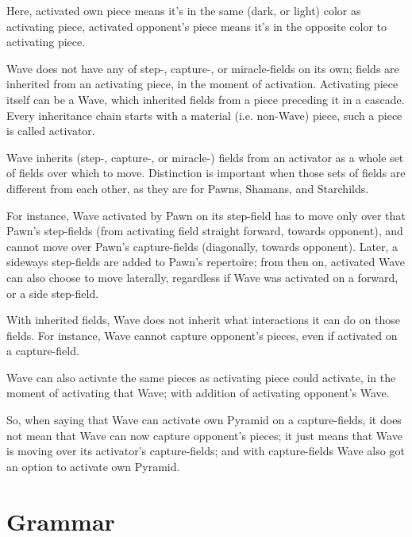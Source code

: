 
Here, activated own piece means it's in the same (dark, or light) color as
activating piece, activated opponent's piece means it's in the opposite color
to activating piece.

Wave does not have any of step-, capture-, or miracle-fields on its own; fields
are inherited from an activating piece, in the moment of activation. Activating
piece itself can be a Wave, which inherited fields from a piece preceding it in
a cascade. Every inheritance chain starts with a material (i.e. non-Wave) piece,
such a piece is called activator.

Wave inherits (step-, capture-, or miracle-) fields from an activator as a whole
set of fields over which to move. Distinction is important when those sets of
fields are different from each other, as they are for Pawns, Shamans, and
Starchilds.

For instance, Wave activated by Pawn on its step-field has to move only over that
Pawn's step-fields (from activating field straight forward, towards opponent), and
cannot move over Pawn's capture-fields (diagonally, towards opponent). Later, a
sideways step-fields are added to Pawn's repertoire; from then on, activated Wave
can also choose to move laterally, regardless if Wave was activated on a forward,
or a side step-field.

With inherited fields, Wave does not inherit what interactions it can do on those
fields. For instance, Wave cannot capture opponent's pieces, even if activated on
a capture-field.

Wave can also activate the same pieces as activating piece could activate, in the
moment of activating that Wave; with addition of activating opponent's Wave.

So, when saying that Wave can activate own Pyramid on a capture-fields, it does
not mean that Wave can now capture opponent's pieces; it just means that Wave is
moving over its activator's capture-fields; and with capture-fields Wave also got
an option to activate own Pyramid.

\clearpage %

\section*{Grammar}
\label{sec:Appendix/Grammar}

